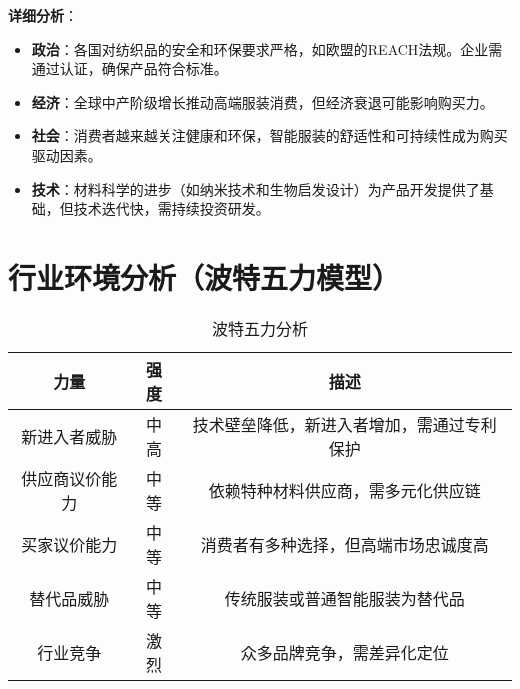 \documentclass[UTF8]{report}
\theoremstyle{MyLineTheoremStyle} %
\theoremstyle{MyBlockTheoremStyle} %
\theoremstyle{MySubsubsectionStyle} %
\begin{document}
\noindent\textbf{详细分析}：
\begin{itemize}[itemsep=1ex, leftmargin=*]
  \item \textbf{政治}：各国对纺织品的安全和环保要求严格，如欧盟的REACH法规。企业需通过认证，确保产品符合标准。
  \item \textbf{经济}：全球中产阶级增长推动高端服装消费，但经济衰退可能影响购买力。
  \item \textbf{社会}：消费者越来越关注健康和环保，智能服装的舒适性和可持续性成为购买驱动因素。
  \item \textbf{技术}：材料科学的进步（如纳米技术和生物启发设计）为产品开发提供了基础，但技术迭代快，需持续投资研发。
\end{itemize}

\section{行业环境分析（波特五力模型）}
\begin{table}[h]
    \centering
    \begin{tabular}{|c|c|c|}
        \hline
        \textbf{力量} & \textbf{强度} & \textbf{描述} \\
        \hline
        新进入者威胁 & 中高 & 技术壁垒降低，新进入者增加，需通过专利保护 \\
        \hline
        供应商议价能力 & 中等 & 依赖特种材料供应商，需多元化供应链 \\
        \hline
        买家议价能力 & 中等 & 消费者有多种选择，但高端市场忠诚度高 \\
        \hline
        替代品威胁 & 中等 & 传统服装或普通智能服装为替代品 \\
        \hline
        行业竞争 & 激烈 & 众多品牌竞争，需差异化定位 \\
        \hline
    \end{tabular}
    \caption{波特五力分析}
\end{table}
\end{document}
